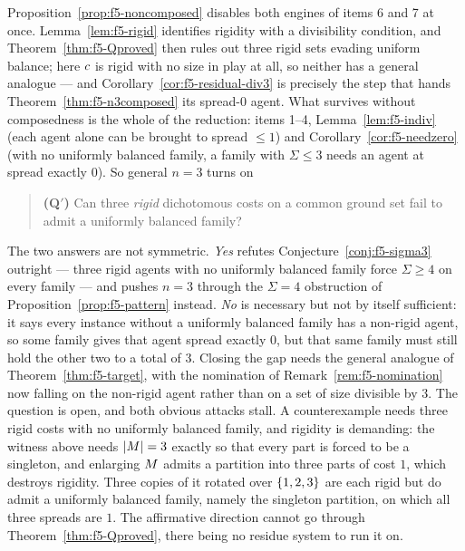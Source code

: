 \begin{remark}[What general $n = 3$ reduces to]
\label{rem:f5-Qprime}
Proposition~\ref{prop:f5-noncomposed} disables both engines of items 6 and 7 at
once. Lemma~\ref{lem:f5-rigid} identifies rigidity with a divisibility
condition, and Theorem~\ref{thm:f5-Qproved} then rules out three rigid sets
evading uniform balance; here $c$ is rigid with no size in play at all, so
neither has a general analogue --- and Corollary~\ref{cor:f5-residual-div3} is
precisely the step that hands Theorem~\ref{thm:f5-n3composed} its spread-$0$
agent. What survives without composedness is the whole of the reduction:
items 1--4, Lemma~\ref{lem:f5-indiv} (each agent alone can be brought to spread
$\le 1$) and Corollary~\ref{cor:f5-needzero} (with no uniformly balanced family,
a family with $\Sigma \le 3$ needs an agent at spread exactly $0$). So general
$n = 3$ turns on
\begin{quote}
  \textbf{(Q$'$)} Can three \emph{rigid} dichotomous costs on a common ground set
  fail to admit a uniformly balanced family?
\end{quote}
The two answers are not symmetric. \emph{Yes} refutes
Conjecture~\ref{conj:f5-sigma3} outright --- three rigid agents with no uniformly
balanced family force $\Sigma \ge 4$ on every family --- and pushes $n = 3$
through the $\Sigma = 4$ obstruction of Proposition~\ref{prop:f5-pattern}
instead. \emph{No} is necessary but not by itself sufficient: it says every
instance without a uniformly balanced family has a non-rigid agent, so some
family gives that agent spread exactly $0$, but that same family must still hold
the other two to a total of $3$. Closing the gap needs the general analogue of
Theorem~\ref{thm:f5-target}, with the nomination of
Remark~\ref{rem:f5-nomination} now falling on the non-rigid agent rather than on
a set of size divisible by $3$. The question is open, and both obvious attacks
stall. A counterexample needs three rigid costs
with no uniformly balanced family, and rigidity is demanding: the witness above
needs $\left\lvert M\right\rvert = 3$ exactly so that every part is forced to be a singleton,
and enlarging $M$ admits a partition into three parts of cost $1$, which
destroys rigidity. Three copies of it rotated over $\left\{1,2,3\right\}$ are each rigid
but do admit a uniformly balanced family, namely the singleton partition, on
which all three spreads are $1$. The affirmative direction cannot go through
Theorem~\ref{thm:f5-Qproved}, there being no residue system to run it on.
\end{remark}

